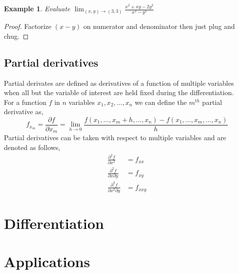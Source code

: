 \documentclass[oneside,11pt,pdftex]{book}%
\numberwithin{equation}{section}
\newtheorem{example}[theorem]{Example}
\numberwithin{section}{chapter}
\numberwithin{equation}{chapter}
\begin{document}
\begin{example}
	Evaluate $ \lim_{(x,y)\rightarrow (3,3)} \frac{x^2+xy-2y^2}{x^2-y^2}$
\end{example}
\begin{proof}
	Factorize $ (x-y) $ on numerator and denominator then just plug and chug.
\end{proof}

\section{Partial derivatives}
Partial derivates are defined as derivatives of a function of multiple variables when all but the variable of interest are held fixed during the differentiation.\\
For a function $ f $ in $ n $ variables $ x_1,x_2,\dots, x_n $ we can define the $ m^{th} $ partial derivative as,
\[ f_{x_m}=\frac{\partial f}{\partial x_m} = \lim_{h \rightarrow 0}\frac{f(x_1,\dots, x_m+h,\dots,x_n)-f(x_1,\dots,x_m, \dots,x_n)}{h}\]
Partial derivatives can be taken with respect to multiple variables and are denoted as follows,
\begin{align*}
	\frac{\partial^2 f}{\partial x^2}&=f_{xx}\\
	\frac{\partial^2 f}{\partial x \partial y}&=f_{xy}\\
	\frac{\partial^3 f}{\partial x^2 \partial y}&=f_{xxy}
\end{align*}


\chapter{Differentiation}


\chapter{Applications}
\backmatter
\end{document}
